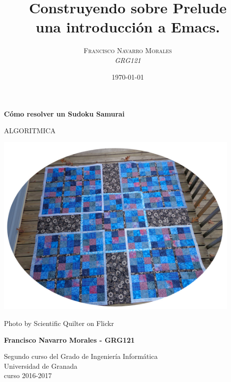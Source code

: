 \documentclass[a4paper, 11pt]{article}
\title{\textbf{Construyendo sobre Prelude}\\ %
					una introducción a Emacs.} %
\author{\textsc{Francisco Navarro Morales} %
\\{\textit{GRG121}}} %
\date{\today} %
\makeatletter
\renewcommand{\maketitle}{
  \begin{flushright} %
  
  {\LARGE\@title} %
  
  \vspace{50pt} %
  
  {\large\@author} %
  \\\@date %
  \vspace{40pt} %
  \end{flushright}
}
\makeatother
\begin{document}
	
	
	\begin{titlepage}
		\begin{center}
			\vspace*{2cm}
			
			{\Huge \textbf{Cómo resolver un Sudoku Samurai}}
			
			 ALGORITMICA 
			
			
			\vspace{0.5cm}
			
			
		    \centering \includegraphics[width=0.9\textwidth]{cover.jpg}
		    
		    
		    {\footnotesize Photo by Scientific Quilter on Flickr}
			
			\vspace{2cm}
			
			\textbf{Francisco Navarro Morales - GRG121 }
			
			\vfill
			
			Segundo curso del Grado de Ingeniería Informática\\
			Universidad de Granada\\
			curso 2016-2017\\
			
		\end{center}
	\end{titlepage}



\renewcommand{\abstractname}{Resumen} %
\end{document}
